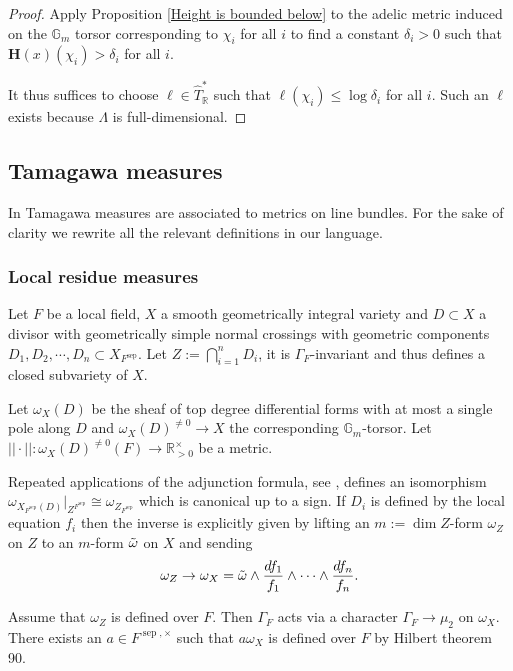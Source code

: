 \documentclass[a4paper,11pt,reqno]{amsart}
\newcommand{\R}{\mathbb{R}}
\newcommand{\G}{\mathbb{G}}
\DeclareMathOperator{\sep}{sep}
\theoremstyle{definition}
\begin{document}
\begin{proof}
	Apply Proposition \ref{Height is bounded below} to the adelic metric induced on the $\G_m$ torsor corresponding to $\chi_i$ for all $i$ to find a constant $\delta_i > 0$ such that $\mathbf{H}(x)(\chi_i) > \delta_i$ for all $i$.
	
	 It thus suffices to choose $\ell \in \hat{T}^{*}_{\R}$ such that $\ell(\chi_i) \leq \log \delta_i$ for all $i$. Such an $\ell$ exists because $\Lambda$ is full-dimensional.
\end{proof}

\subsection{Tamagawa measures}
In \cite[\S 2.1, \S 2.4]{Chambert-Loir2010Igusa} Tamagawa measures are associated to metrics on line bundles. For the sake of clarity we rewrite all the relevant definitions in our language.

\subsubsection{Local residue measures}
\label{Local residue measures}
Let $F$ be a local field, $X$ a smooth geometrically integral variety and $D \subset X$ a divisor with geometrically simple normal crossings with geometric components $D_1, D_2, \cdots, D_n \subset X_{F^{\sep}}$. Let $Z := \bigcap_{i = 1}^n D_i$, it is $\Gamma_F$-invariant and thus defines a closed subvariety of $X$.

Let $\omega_X(D)$ be the sheaf of top degree differential forms with at most a single pole along $D$ and $\omega_X(D)^{\neq 0} \to X$ the corresponding $\G_m$-torsor. Let $||\cdot||: \omega_X(D)^{\neq 0}(F) \to \R^{\times}_{> 0}$ be a metric. 

Repeated applications of the adjunction formula, see \cite[\S 2.1.12]{Chambert-Loir2010Igusa}, defines an isomorphism $\omega_{X_{F^{\sep}}(D)}|_{Z^{F^{\sep}}} \cong \omega_{Z_{F^{\sep}}}$ which is canonical up to a sign. If $D_i$ is defined by the local equation $f_i$ then the inverse is explicitly given by lifting an $m := \dim Z$-form 
$\omega_Z$ on $Z$ to an $m$-form $\Tilde{\omega}$ on $X$ and sending
\[\omega_Z \to \omega_X = \Tilde{\omega} \wedge \frac{d f_1}{f_1} \wedge \cdots \wedge \frac{d f_n}{f_n}. \] 

Assume that $\omega_Z$ is defined over $F$. Then $\Gamma_F$ acts via a character $\Gamma_F \to \mu_2$ on $\omega_X$. There exists an $a \in F^{\sep, \times}$ such that $a \omega_X$ is defined over $F$ by Hilbert theorem 90.
\end{document}
